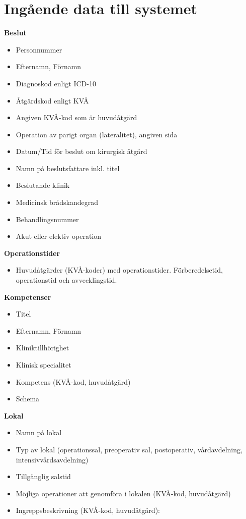 \section{Ingående data till systemet}
\label{sec:Ingaende data till systemet}

\textbf{Beslut}
\begin{itemize}
    \item Personnummer
    \item Efternamn, Förnamn
    \item Diagnoskod enligt ICD-10
    \item Åtgärdskod enligt KVÅ
    \item Angiven KVÅ-kod som är huvudåtgärd
    \item Operation av parigt organ (lateralitet), angiven sida
    \item Datum/Tid för beslut om kirurgisk åtgärd
    \item Namn på beslutsfattare inkl. titel
    \item Beslutande klinik
    \item Medicinsk brådskandegrad
    \item Behandlingsnummer
    \item Akut eller elektiv operation
\end{itemize}

\textbf{Operationstider}
\begin{itemize}
    \item Huvudåtgärder (KVÅ-koder) med operationstider. Förberedelsetid, operationstid och avvecklingstid.
\end{itemize}

\textbf{Kompetenser}
\begin{itemize}
    \item Titel
    \item Efternamn, Förnamn
    \item Kliniktillhörighet
    \item Klinisk specialitet
    \item Kompetens (KVÅ-kod, huvudåtgärd)
    \item Schema
\end{itemize}

\textbf{Lokal}
\begin{itemize}
    \item Namn på lokal
    \item Typ av lokal (operationssal, preoperativ sal, postoperativ, vårdavdelning, intensivvårdsavdelning)
    \item Tillgänglig salstid
    \item Möjliga operationer att genomföra i lokalen (KVÅ-kod, huvudåtgärd)
    \item Ingreppsbeskrivning (KVÅ-kod, huvudåtgärd):
\end{itemize}


